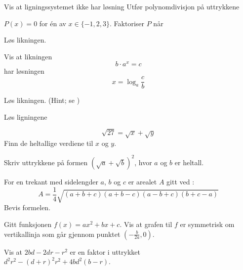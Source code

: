  \vs \vs
{}
Vis at ligningssystemet ikke har løsning
\nes
{}
Utfør polynomdivisjon på uttrykkene \os
{}

\nes

$ P(x)=0 $ for én av $ x\in\{-1, 2, 3\} $.
Faktoriser $ P $ når

\nes

Løs likningen. \os
{}

\newpage
{}
Vis at likningen 
\[ b\cdot a^x =c \]
har løsningen
\[ x=\log_a\frac{c}{b} \]

Løs likningen. (Hint; se )\os

 \os
{}

Løs ligningene


\newpage
{} \vs
\[ \sqrt{27}=\sqrt{x}+\sqrt{y} \]
Finn de heltallige verdiene til $ x $ og $ y $.

Skriv uttrykkene på formen $ \left(\sqrt{a}+\sqrt{b}\right)^2 $, hvor $ a $ og $ b $ er heltall.

For en trekant med sidelengder $ a $, $ b $ og $ c $ er arealet $ A $ gitt ved :
\[ A=\frac{1}{4}\sqrt{(a+b+c)(a+b-c)(a-b+c)(b+c-a)} \]
Bevis formelen.

Gitt funksjonen  ${f(x)=a x^2+bx +c} $. Vis at grafen til $ f $ er symmetrisk om vertikallinja som går gjennom punktet $ \left(-\frac{b}{2a}, 0\right) $.

Vis at $ 2bd-2dr-r^2 $ er en faktor i uttrykket\\ $ d^2  r^2-(d+r)^2  r^2+4b d^2 (b-r) $.
